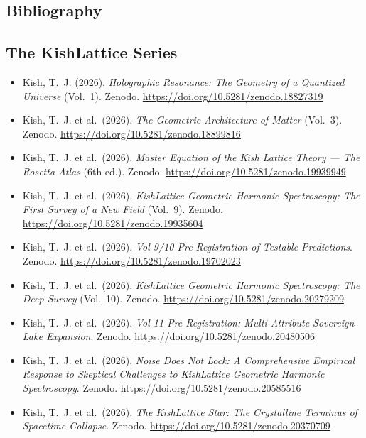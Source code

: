 \documentclass[11pt, letterpaper, openany]{book}
\begin{document}
\begin{empiricalbox}
\chapter*{Bibliography}

\section*{The KishLattice Series}
\begin{itemize}
    \item Kish, T.~J. (2026). \textit{Holographic Resonance: The Geometry of a Quantized Universe} (Vol.~1). Zenodo. \url{https://doi.org/10.5281/zenodo.18827319}
    \item Kish, T.~J. et al.\ (2026). \textit{The Geometric Architecture of Matter} (Vol.~3). Zenodo. \url{https://doi.org/10.5281/zenodo.18899816}
    \item Kish, T.~J. et al.\ (2026). \textit{Master Equation of the Kish Lattice Theory --- The Rosetta Atlas} (6th ed.). Zenodo. \url{https://doi.org/10.5281/zenodo.19939949}
    \item Kish, T.~J. et al.\ (2026). \textit{KishLattice Geometric Harmonic Spectroscopy: The First Survey of a New Field} (Vol.~9). Zenodo. \url{https://doi.org/10.5281/zenodo.19935604}
    \item Kish, T.~J. et al.\ (2026). \textit{Vol 9/10 Pre-Registration of Testable Predictions}. Zenodo. \url{https://doi.org/10.5281/zenodo.19702023}
    \item Kish, T.~J. et al.\ (2026). \textit{KishLattice Geometric Harmonic Spectroscopy: The Deep Survey} (Vol.~10). Zenodo. \url{https://doi.org/10.5281/zenodo.20279209}
    \item Kish, T.~J. et al.\ (2026). \textit{Vol 11 Pre-Registration: Multi-Attribute Sovereign Lake Expansion}. Zenodo. \url{https://doi.org/10.5281/zenodo.20480506}
    \item Kish, T.~J. et al.\ (2026). \textit{Noise Does Not Lock: A Comprehensive Empirical Response to Skeptical Challenges to KishLattice Geometric Harmonic Spectroscopy}. Zenodo. \url{https://doi.org/10.5281/zenodo.20585516}
	\item Kish, T.~J. et al.\ (2026). \textit{The KishLattice Star: The Crystalline Terminus of Spacetime Collapse}. Zenodo. \url{https://doi.org/10.5281/zenodo.20370709}
\end{itemize}


\end{empiricalbox}
\end{document}
